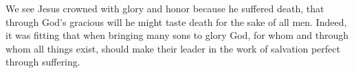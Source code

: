 \lettrine[lines=3]{W}{}e see Jesus crowned with glory and honor because he suffered death, that through God’s gracious will he might taste death for the sake of all men. Indeed, it was fitting that when bringing many sons to glory God, for whom and through whom all things exist, should make their leader in the work of salvation perfect through suffering.
